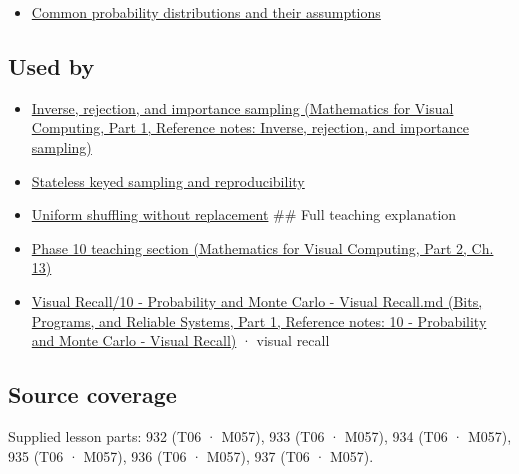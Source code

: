 \begin{itemize}
\tightlist
\item
  \hyperref[appendix-a2360b435383]{Common probability distributions and their assumptions}
\end{itemize}

\subsection{Used by}\label{appendix-e0f7c7e08f3a-used-by}

\hypertarget{appendix-e0f7c7e08f3a-used-by}{}

\begin{itemize}
\item
  \href{../02-Mathematics-for-Visual-Computing-P01/main.pdf\#appendix-8d863ed954d0}{Inverse, rejection, and importance sampling (Mathematics for Visual Computing, Part 1, Reference notes: Inverse, rejection, and importance sampling)}
\item
  \hyperref[appendix-daaf25bfd3a0]{Stateless keyed sampling and reproducibility}
\item
  \hyperref[appendix-184fcc411663]{Uniform shuffling without replacement} \#\# Full teaching explanation
\item
  \href{../02-Mathematics-for-Visual-Computing-P02/main.pdf\#02-foundations-ii-ch029-a-computer-produces-deterministic-pseudorandom-sequences}{Phase 10 teaching section (Mathematics for Visual Computing, Part 2, Ch. 13)}
\item
  \href{../01-Bits-Programs-and-Reliable-Systems-P01/main.pdf\#appendix-cb5af353ef77}{Visual Recall/10 - Probability and Monte Carlo - Visual Recall.md (Bits, Programs, and Reliable Systems, Part 1, Reference notes: 10 - Probability and Monte Carlo - Visual Recall)} · visual recall
\end{itemize}

\subsection{Source coverage}\label{appendix-e0f7c7e08f3a-source-coverage}

\hypertarget{appendix-e0f7c7e08f3a-source-coverage}{}

Supplied lesson parts: 932 (T06 · M057), 933 (T06 · M057), 934 (T06 · M057), 935 (T06 · M057), 936 (T06 · M057), 937 (T06 · M057).
